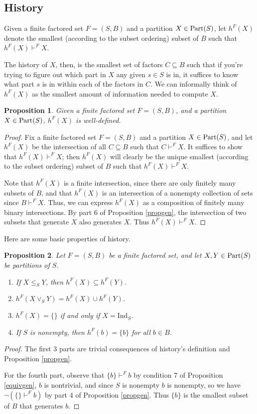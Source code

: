 \documentclass[authordate,onecolumn]{miri-tech-article}
\newtheorem{proposition}{Proposition}
\begin{document}
\subsection{History}
\begin{definition}\label{templabel8}
Given a finite factored set $F=(S,B)$ and a partition $X\in \text{Part}(S)$, let $h^F(X)$ denote the smallest (according to the subset ordering) subset of $B$ such that $h^F(X)\vdash^F X$.
\end{definition}
The history of $X$, then, is the smallest set of factors $C \subseteq B$ such that if you're trying to figure out which part in $X$ any given $s \in S$ is in, it suffices to know what part $s$ is in within each of the factors in $C$. We can informally think of $h^F(X)$ as the smallest amount of information needed to compute $X$.
\begin{proposition}
Given a finite factored set $F=(S,B)$, and a partition $X\in\text{Part}(S)$, $h^F(X)$ is well-defined.
\end{proposition}
\begin{proof}
Fix a finite factored set $F=(S,B)$ and a partition $X\in\text{Part}(S)$, and let $h^F(X)$ be the intersection of all $C\subseteq B$ such that $C\vdash^F X$. It suffices to show that $h^F(X)\vdash^F X$; then $h^F(X)$ will clearly be the unique smallest (according to the subset ordering) subset of $B$ such that $h^F(X)\vdash^F X$.

Note that $h^F(X)$ is a finite intersection, since there are only finitely many subsets of $B$, and that $h^F(X)$ is an intersection of a nonempty collection of sets since $B\vdash^F X$. Thus, we can express $h^F(X)$ as a composition of finitely many binary intersections. By part 6 of Proposition \ref{propgen}, the intersection of two subsets that generate $X$ also generates $X$. Thus $h^F(X)\vdash^F X$. 
\end{proof}
Here are some basic properties of history.
\begin{proposition}\label{prophist}
Let $F=(S,B)$ be a finite factored set, and let $X,Y\in \text{Part}(S)$ be partitions of $S$.
\begin{enumerate}
    \item If $X\leq_S Y$, then $h^F(X)\subseteq h^F(Y)$.
    \item $h^F(X\vee_S Y)=h^F(X)\cup h^F(Y)$.
    \item $h^F(X)=\{\}$ if and only if $X=\text{Ind}_S$.
    \item If $S$ is nonempty, then $h^F(b)=\{b\}$ for all $b\in B$.
\end{enumerate}
\end{proposition}
\begin{proof}
The first 3 parts are trivial consequences of history's definition and Proposition \ref{propgen}.

For the fourth part, observe that $\{b\}\vdash^F b$ by condition 7 of Proposition \ref{equivgen}, $b$ is nontrivial, and since $S$ is nonempty $b$ is nonempty, so we have $\neg(\{\}\vdash^F b)$ by part 4 of Proposition \ref{propgen}. Thus $\{b\}$ is the smallest subset of $B$ that generates $b$.
\end{proof}
\end{document}
